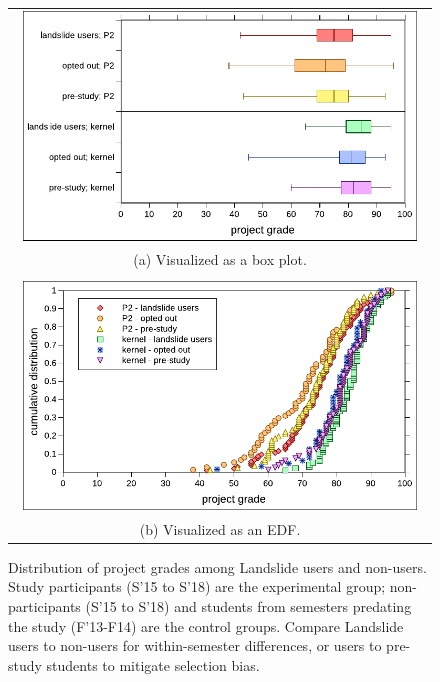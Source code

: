 \begin{figure}[p]
	\begin{center}
	\begin{tabular}{c}
		\includegraphics[width=0.96\textwidth]{photo-of-ze-studence.pdf}
		\\
		(a) Visualized as a box plot.
		\\
		\\
		\includegraphics[width=0.96\textwidth]{photo-of-ze-studence-cdf.pdf}
		\\
		(b) Visualized as an EDF.
	\end{tabular}
	\end{center}
	\caption{Distribution of project grades among Landslide users and non-users.
	Study participants (S'15 to S'18) are the experimental group;
	non-participants (S'15 to S'18)
	and students from semesters predating the study (F'13-F14) are the control groups.
	Compare Landslide users to non-users for within-semester differences,
	or users to pre-study students to mitigate selection bias.}
	\label{fig:photo-of-ze-studence}
\end{figure}

